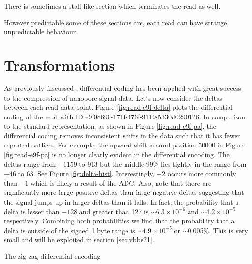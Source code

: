 



There is sometimes a stall-like section which terminates the read as well.




However predictable some of these sections are, each read can have strange unpredictable behaviour.

\section{Transformations}



As previously discussed
, differential coding has been applied with great success to the compression of nanopore signal data.
Let's now consider the deltas between each read data point. Figure \ref{fig:read-e9f-delta} plots the differential coding of the read with ID e9f08690-171f-476f-9119-5330d0290126. In comparison to the standard representation, as shown in Figure \ref{fig:read-e9f-pa}, the differential coding removes inconsistent shifts in the data such that it has fewer repeated outliers. For example, the upward shift around position 50000 in Figure \ref{fig:read-e9f-pa} is no longer clearly evident in the differential encoding.
The deltas range from $-1159$ to 913 but the middle 99\% lies tightly in the range from $-46$ to 63. See Figure \ref{fig:delta-hist}.
Interestingly, $-2$ occurs more commonly than $-1$ which is likely a result of the ADC.
Also, note that there are significantly more large positive deltas than large negative deltas suggesting that the signal jumps up in larger deltas than it falls.
In fact, the probability that a delta is lesser than $-128$ and greater than 127 is $\sim6.3\times 10^{-6}$ and $\sim4.2\times 10^{-5}$ respectively. Combining both probabilities we find that the probability that a delta is outside of the signed 1 byte range is $\sim4.9\times 10^{-5}$ or $\sim$0.005\%. This is very small and will be exploited in section \ref{sec:vbbe21}.






The zig-zag differential encoding



